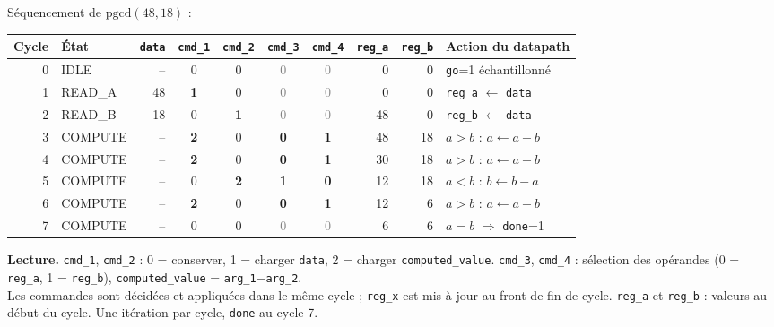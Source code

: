 \begin{frame}[t]{Séquencement de $\mathrm{pgcd}(48,18)$ : }
  \centering
  \footnotesize
  \setlength{\tabcolsep}{5pt}
  \renewcommand{\arraystretch}{1.2}
  \begin{tabular}{@{}r l r c c c c r r l@{}}
    \toprule
    \textbf{Cycle} & \textbf{État} & \texttt{data} &
    \texttt{cmd\_1} & \texttt{cmd\_2} & \texttt{cmd\_3} & \texttt{cmd\_4} &
    \texttt{reg\_a} & \texttt{reg\_b} & \textbf{Action du datapath} \\
    \midrule
    0 & IDLE & -- & 0 & 0 & \textcolor{gray}{0} & \textcolor{gray}{0} & 0 & 0 & \texttt{go}=1 échantillonné \\
    1 & READ\_A & 48 & \cellcolor{hl}\textbf{1} & 0 & \textcolor{gray}{0} & \textcolor{gray}{0} & 0 & 0 & \texttt{reg\_a} $\leftarrow$ \texttt{data} \\
    2 & READ\_B & 18 & 0 & \cellcolor{hl}\textbf{1} & \textcolor{gray}{0} & \textcolor{gray}{0} & 48 & 0 & \texttt{reg\_b} $\leftarrow$ \texttt{data} \\
    3 & COMPUTE & -- & \cellcolor{hl}\textbf{2} & 0 & \cellcolor{hl}\textbf{0} & \cellcolor{hl}\textbf{1} & 48 & 18 & $a>b$ : $a \leftarrow a-b$ \\
    4 & COMPUTE & -- & \cellcolor{hl}\textbf{2} & 0 & \cellcolor{hl}\textbf{0} & \cellcolor{hl}\textbf{1} & 30 & 18 & $a>b$ : $a \leftarrow a-b$ \\
    5 & COMPUTE & -- & 0 & \cellcolor{hl}\textbf{2} & \cellcolor{hl}\textbf{1} & \cellcolor{hl}\textbf{0} & 12 & 18 & $a<b$ : $b \leftarrow b-a$ \\
    6 & COMPUTE & -- & \cellcolor{hl}\textbf{2} & 0 & \cellcolor{hl}\textbf{0} & \cellcolor{hl}\textbf{1} & 12 & 6 & $a>b$ : $a \leftarrow a-b$ \\
    7 & COMPUTE & -- & 0 & 0 & \textcolor{gray}{0} & \textcolor{gray}{0} & 6 & 6 & $a=b$ $\Rightarrow$ \texttt{done}=1 \\
    \bottomrule
  \end{tabular}

  \vspace{0.8em}
  \begin{minipage}{0.96\linewidth}
    \scriptsize
    \textbf{Lecture.}
    \texttt{cmd\_1}, \texttt{cmd\_2} : 0 = conserver, 1 = charger \texttt{data}, 2 = charger \texttt{computed\_value}.
    \texttt{cmd\_3}, \texttt{cmd\_4} : sélection des opérandes (0 = \texttt{reg\_a}, 1 = \texttt{reg\_b}), \texttt{computed\_value} = \texttt{arg\_1}$-$\texttt{arg\_2}.\\
    Les commandes sont décidées et appliquées dans le même cycle ; \texttt{reg\_x} est mis à jour au front de fin de cycle.
    \texttt{reg\_a} et \texttt{reg\_b} : valeurs au début du cycle. Une itération par cycle, \texttt{done} au cycle 7.
  \end{minipage}

\end{frame}


